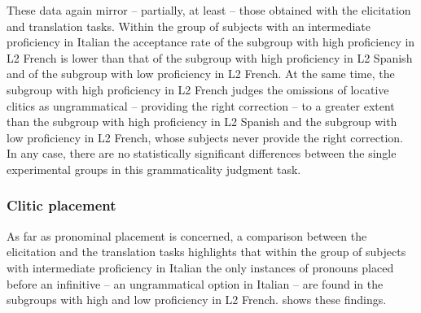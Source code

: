 \documentclass[output=paper,modfonts,nonflat,newtxmath]{langsci/langscibook}
\begin{document}
\begin{table}
\caption{\label{tab:sciutti:5} Judgments on items including an omission of a locative clitic (ungrammatical)}
\end{table}
These data again mirror – partially, at least – those obtained with the elicitation and translation tasks. Within the group of subjects with an intermediate proficiency in Italian the acceptance rate of the subgroup with high proficiency in L2 French is lower than that of the subgroup with high proficiency in L2 Spanish and of the subgroup with low proficiency in L2 French. At the same time, the subgroup with high proficiency in L2 French  judges the omissions of locative clitics as ungrammatical – providing the right correction – to a greater extent than the subgroup with high proficiency in L2 Spanish and the subgroup with low proficiency in L2 French, whose subjects never provide the right correction. In any case, there are no statistically significant differences between the single experimental groups in this grammaticality judgment task.

\subsubsection{Clitic placement} %

As far as pronominal placement is concerned, a comparison between the elicitation and the translation tasks highlights that within the group of subjects with intermediate proficiency in Italian the only instances of pronouns placed before an infinitive – an ungrammatical option in Italian – are found in the subgroups with high and low proficiency in L2 French.  shows these findings.
\end{document}
